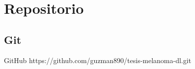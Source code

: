 \documentclass{beamer}
\begin{document}
\section{Repositorio}

\subsection{Git}

\begin{frame}{GitHub}
https://github.com/guzman890/tesis-melanoma-dl.git
\end{frame}

%

\end{document}
